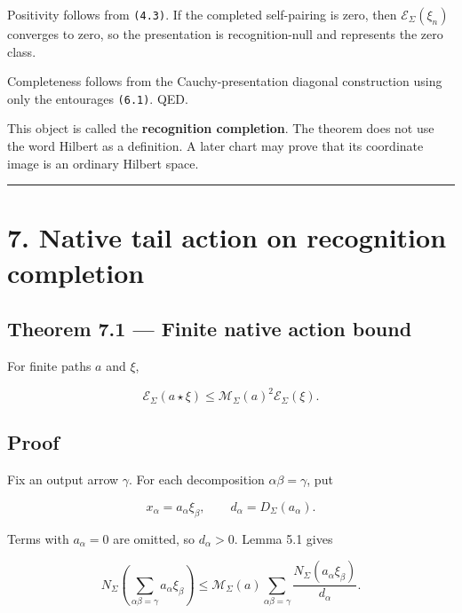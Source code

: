 Positivity follows from \texttt{(4.3)}. If the completed self-pairing is zero, then
\(\mathcal E_\Sigma(\xi_n)\) converges to zero, so the presentation is
recognition-null and represents the zero class.

Completeness follows from the Cauchy-presentation diagonal construction using
only the entourages \texttt{(6.1)}. QED.

This object is called the \textbf{recognition completion}. The theorem does not use
the word Hilbert as a definition. A later chart may prove that its coordinate
image is an ordinary Hilbert space.

\begin{center}\rule{0.5\linewidth}{0.5pt}\end{center}

\hypertarget{native-tail-action-on-recognition-completion}{%
\section{7. Native tail action on recognition completion}\label{native-tail-action-on-recognition-completion}}

\hypertarget{theorem-7.1-finite-native-action-bound}{%
\subsection{Theorem 7.1 --- Finite native action bound}\label{theorem-7.1-finite-native-action-bound}}

For finite paths \(a\) and \(\xi\),

\[
\boxed{
\mathcal E_\Sigma(a\star\xi)
\le
\mathcal M_\Sigma(a)^2\mathcal E_\Sigma(\xi).
}
\tag{7.1}
\]

\hypertarget{proof-7}{%
\subsection{Proof}\label{proof-7}}

Fix an output arrow \(\gamma\). For each decomposition
\(\alpha\beta=\gamma\), put

\[
x_\alpha=a_\alpha\xi_\beta,
\qquad
d_\alpha=D_\Sigma(a_\alpha).
\]

Terms with \(a_\alpha=0\) are omitted, so \(d_\alpha>0\). Lemma 5.1 gives

\[
N_\Sigma\left(
\sum_{\alpha\beta=\gamma}a_\alpha\xi_\beta
\right)
\le
\mathcal M_\Sigma(a)
\sum_{\alpha\beta=\gamma}
\frac{N_\Sigma(a_\alpha\xi_\beta)}{d_\alpha}.
\tag{7.2}
\]

